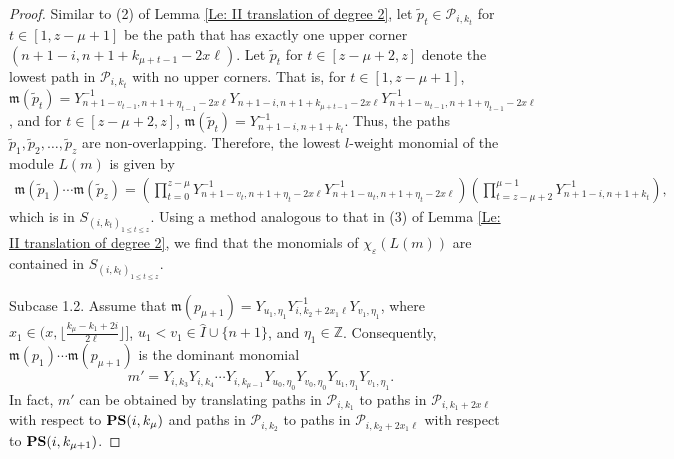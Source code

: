\documentclass[10pt,a4paper]{amsart}
\begin{document}
\begin{proof}
Similar to (2) of Lemma \ref{Le: II translation of degree 2}, let $\widetilde{p}_t\in \mathscr{P}_{i,k_t}$ for $t \in [1, z-\mu+1]$ be the path that has exactly one upper corner $(n+1-i,n+1+k_{\mu+t-1}-2x \ell)$. Let $\widetilde{p}_t$ for $t\in[z-\mu+2, z]$ denote the lowest path in $\mathscr{P}_{i,k_t}$ with no upper corners. That is, for $t \in [1, z-\mu+1]$, $\mathfrak{m}(\widetilde{p}_{t})=Y_{n+1-v_{t-1},n+1+\eta_{t-1}-2x \ell}^{-1}Y_{n+1-i,n+1+k_{\mu+t-1}-2x \ell}Y_{n+1-u_{t-1}, n+1+\eta_{t-1}-2x \ell}^{-1}$, and for $t\in[z-\mu+2, z]$, $\mathfrak{m}(\widetilde{p}_{t})=Y_{n+1-i,n+1+k_t}^{-1}$. Thus, the paths $\widetilde{p}_{1}, \widetilde{p}_{2}, \ldots, \widetilde{p}_{z}$ are non-overlapping. Therefore, the lowest $l$-weight monomial of the module $L(m)$ is given by 
\begin{align*}
\mathfrak{m}(\widetilde{p}_{1})\cdots \mathfrak{m}(\widetilde{p}_{z})=\left(\prod_{t=0}^{z-\mu}Y_{n+1-v_t,n+1+\eta_t-2x \ell}^{-1}Y_{n+1-u_t,n+1+\eta_t-2x \ell}^{-1}\right)\left(\prod_{t=z-\mu+2}^{\mu-1}Y_{n+1-i,n+1+k_{t}}^{-1}\right),
\end{align*}
which is in $S_{(i,k_t)_{1 \leq t \leq z}}$. Using a method analogous to that in (3) of Lemma \ref{Le: II translation of degree 2}, we find that the monomials of $\chi_\varepsilon(L(m))$ are contained in $S_{(i,k_t)_{1 \leq t \leq z}}$.






Subcase 1.2. Assume that $\mathfrak{m}(p_{\mu+1})=Y_{u_1,\eta_1}Y_{i,k_2+2x_1\ell}^{-1}Y_{v_1,\eta_1}$, where $x_1\in (x,\lfloor\frac{k_\mu-k_1+2i}{2 \ell}\rfloor]$, $u_1<v_1 \in \hat{I} \cup \{n+1\}$, and $\eta_1\in \mathbb{Z}$. Consequently, $\mathfrak{m}(p_1)\cdots \mathfrak{m}(p_{\mu+1})$ is the dominant monomial
\[
m'=Y_{i,k_{3}}Y_{i,k_4}\cdots Y_{i,k_{\mu-1}} Y_{u_0,\eta_0}Y_{v_0,\eta_0} Y_{u_1,\eta_1}Y_{v_1,\eta_1}.
\]
In fact, $m'$ can be obtained by translating paths in $\mathscr{P}_{i,k_1}$ to paths in $\mathscr{P}_{i,k_1+2x \ell}$ with respect to ${\bf PS}(i,k_{\mu})$ and paths in $\mathscr{P}_{i,k_2}$ to paths in $\mathscr{P}_{i,k_2+2x_1 \ell}$ with respect to ${\bf PS}(i,k_{\mu+1})$.


\end{proof}
\end{document}
